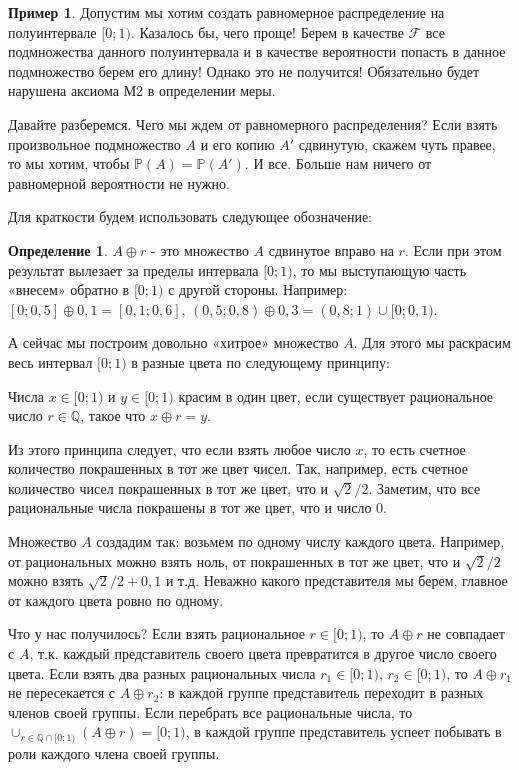 \documentclass[pdftex, 12pt, a4paper]{article}
\def \mbb{\mathbb}
\def \PP{\mbb{P}}
\def\F{\ensuremath{\mathcal{F}}} %
\theoremstyle{definition} %
\newtheorem*{mydef}{Определение}
\newtheorem{myex}{Пример}
\numberwithin{problem}{section}
\numberwithin{blits}{section}
\begin{document}
\begin{myex} Допустим мы хотим создать равномерное распределение на полуинтервале $[0;1)$. Казалось бы, чего проще! Берем в качестве $\F$ все подмножества данного полуинтервала и в качестве вероятности попасть в данное подмножество берем его длину! Однако это не получится! Обязательно будет нарушена аксиома М2 в определении меры.
\end{myex}

Давайте разберемся. Чего мы ждем от равномерного распределения? Если взять произвольное подмножество $A$ и его копию $A'$ сдвинутую, скажем чуть правее, то мы хотим, чтобы $\PP(A)=\PP(A')$. И все. Больше нам ничего от равномерной вероятности не нужно.

Для краткости будем использовать следующее обозначение:

\begin{mydef} $A\oplus r$ - это множество $A$ сдвинутое вправо на $r$. Если при этом результат вылезает за пределы интервала $[0;1)$, то мы выступающую часть «внесем» обратно в $[0;1)$ с другой стороны. Например: $[0;0,5]\oplus 0,1=[0,1;0,6]$, $(0,5;0,8)\oplus 0,3=(0,8;1)\cup [0;0,1)$.
\end{mydef}

А сейчас мы построим довольно «хитрое» множество $A$. Для этого мы раскрасим весь интервал $[0;1)$ в разные цвета по следующему принципу:

Числа $x\in[0;1)$ и $y\in[0;1)$ красим в один цвет, если существует рациональное число $r\in\mathbb{Q}$, такое что $x\oplus r=y$.

Из этого принципа следует, что если взять любое число $x$, то есть счетное количество покрашенных в тот же цвет чисел. Так, например, есть счетное количество чисел покрашенных в тот же цвет, что и $\sqrt{2}/2$. Заметим, что все рациональные числа покрашены в тот же цвет, что и число $0$.


Множество $A$ создадим так: возьмем по одному числу каждого цвета. Например, от рациональных можно взять ноль, от покрашенных в тот же цвет, что и $\sqrt{2}/2$ можно взять $\sqrt{2}/2+0,1$ и т.д. Неважно какого представителя мы берем, главное от каждого цвета ровно по одному.

Что у нас получилось? Если взять рациональное $r\in[0;1)$, то $A\oplus r$ не совпадает с $A$, т.к. каждый представитель своего цвета превратится в другое число своего цвета. Если взять два разных рациональных числа $r_{1}\in [0;1)$, $r_{2}\in[0;1)$, то $A\oplus r_{1}$ не пересекается с $A\oplus r_{2}$: в каждой группе представитель переходит в разных членов своей группы. Если перебрать все рациональные числа, то $\cup_{r\in\mathbb{Q}\cap [0;1)} (A\oplus r)=[0;1)$, в каждой группе представитель успеет побывать в роли каждого члена своей группы.
\end{document}
